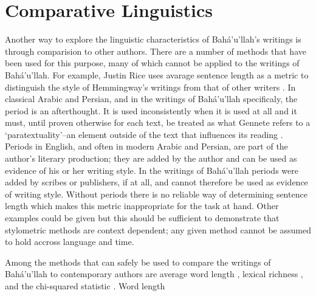 \documentclass[12pt, oneside]{report}
\begin{document}
\section{Comparative Linguistics}
\par 
Another way to explore the linguistic characteristics of Bah\'{a}'u'llah's writings is through comparision to other authors. There are a number of methods that have been used for this purpose, many of which cannot be applied to the writings of Bah\'{a}'u'llah. For example, Justin Rice uses avarage sentence length as a metric to distinguish the style of Hemmingway's writings from that of other writers \cite{justin_rice_what_2018}. In classical Arabic and Persian, and in the writings of Bah\'{a}'u'llah specificaly, the period is an afterthought. It is used inconsistently when it is used at all and it must, until proven otherwise for each text, be treated as what Gennete refers to a `paratextuality'–an element outside of the text that influences its reading \cite{genette_gerard_palimpsests:_1997}. Periods in English, and often in modern Arabic and Persian, are part of the author's literary production; they are added by the author and can be used as evidence of his or her writing style. In the writings of Bah\'{a}'u'llah periods were added by scribes or publishers, if at all, and cannot therefore be used as evidence of writing style. Without periods there is no reliable way of determining sentence length which makes this metric inappropriate for the task at hand. Other examples could be given but this should be sufficient to demonstrate that stylometric methods are context dependent; any given method cannot be assumed to hold accross language and time.
\par 
Among the methods that can safely be used to compare the writings of Bah\'{a}'u'llah to contemporary authors are average word length \cite{justin_rice_what_2018}, lexical richness \cite{justin_rice_what_2018}, and the chi-squared statistic  \cite{kilgarriff_comparing_2001} \cite{laramee_introduction_2018}. Word length
\end{document}
